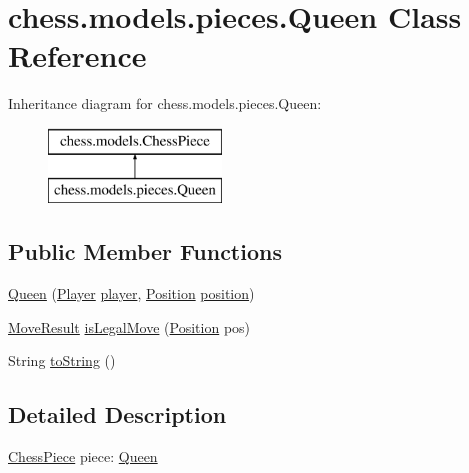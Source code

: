 \hypertarget{classchess_1_1models_1_1pieces_1_1_queen}{}\section{chess.\+models.\+pieces.\+Queen Class Reference}
\label{classchess_1_1models_1_1pieces_1_1_queen}
Inheritance diagram for chess.\+models.\+pieces.\+Queen\+:\begin{figure}[H]
\begin{center}
\leavevmode
\includegraphics[height=2.000000cm]{classchess_1_1models_1_1pieces_1_1_queen}
\end{center}
\end{figure}
\subsection*{Public Member Functions}
\begin{DoxyCompactItemize}
\item 
\mbox{\hyperlink{classchess_1_1models_1_1pieces_1_1_queen_acc127213b82632b23448f334512b34b8}{Queen}} (\mbox{\hyperlink{enumchess_1_1models_1_1enums_1_1_player}{Player}} \mbox{\hyperlink{classchess_1_1models_1_1_chess_piece_a3bcc8a24667318b5aab8c146adcc3eb7}{player}}, \mbox{\hyperlink{classchess_1_1models_1_1_position}{Position}} \mbox{\hyperlink{classchess_1_1models_1_1_chess_piece_a0e4f8616b75e548f269d3971846396f3}{position}})
\item 
\mbox{\hyperlink{enumchess_1_1models_1_1enums_1_1_move_result}{Move\+Result}} \mbox{\hyperlink{classchess_1_1models_1_1pieces_1_1_queen_a99486b83609e973af4c09ddcf3582617}{is\+Legal\+Move}} (\mbox{\hyperlink{classchess_1_1models_1_1_position}{Position}} pos)
\item 
String \mbox{\hyperlink{classchess_1_1models_1_1pieces_1_1_queen_a723a09d8252bb14578d33c099242e37d}{to\+String}} ()
\end{DoxyCompactItemize}


\subsection{Detailed Description}
\mbox{\hyperlink{classchess_1_1models_1_1_chess_piece}{Chess\+Piece}} piece\+: \mbox{\hyperlink{classchess_1_1models_1_1pieces_1_1_queen}{Queen}} 

